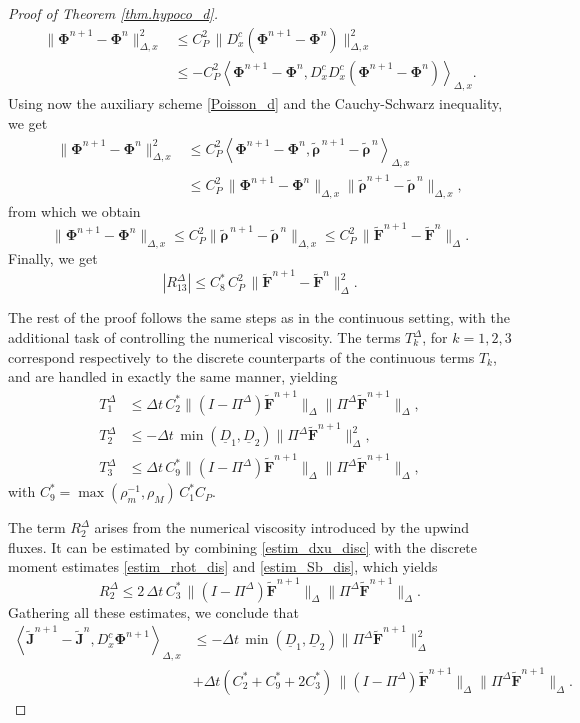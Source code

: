 \documentclass[reqno]{amsart}
\newcommand{\Ft}{{\widetilde{F}}}
\newcommand{\rhot}{\widetilde{\rho}}
\newcommand{\Jt}{\widetilde{J}}
\newcommand{\Ftbf}{\mathbf{\Ft}}
\newcommand{\Phibf}{\boldsymbol{\Phi}}
\newcommand{\rhotbf}{\boldsymbol{\rhot}}
\newcommand{\Jtbf}{\mathbf{\Jt}}
\newcommand{\lla}{\left\langle}
\newcommand{\rra}{\right\rangle}
\numberwithin{equation}{section}
\begin{document}
\begin{proof}[Proof of Theorem \ref{thm.hypoco_d}]
    \begin{align*}
        \|\Phibf^{n+1}-\Phibf^n\|_{\Delta,x}^2&\leq C_P^2\,\|D_x^c(\Phibf^{n+1}-\Phibf^n)\|_{\Delta,x}^2\\
        &\leq -C_P^2\lla \Phibf^{n+1}-\Phibf^n,D_x^cD_x^c(\Phibf^{n+1}-\Phibf^n)\rra_{\Delta,x}.
    \end{align*}
    Using now the auxiliary scheme \eqref{Poisson_d} and the Cauchy-Schwarz inequality, we get
    \begin{align*}
        \|\Phibf^{n+1}-\Phibf^n\|_{\Delta,x}^2&\leq C_P^2\lla \Phibf^{n+1}-\Phibf^n,\rhotbf^{\,n+1}-\rhotbf^{\,n}\rra_{\Delta,x}\\
        &\leq C_P^2 \,\|\Phibf^{n+1}-\Phibf^n\|_{\Delta,x}\|\rhotbf^{n+1}-\rhotbf^{\,n}\|_{\Delta,x},
    \end{align*}
    from which we obtain
    \[
    \|\Phibf^{n+1}-\Phibf^n\|_{\Delta,x}\leq C_P^2 \|\rhotbf^{\,n+1}-\rhotbf^{\,n}\|_{\Delta,x}\leq C_P^2 \,\|\Ftbf^{n+1}-\Ftbf^n\|_{\Delta}.
    \]
    Finally, we get
    \begin{equation}\label{estim_T133}
        |R_{13}^\Delta|\leq C_{8}^*\,C_P^2\,\|\Ftbf^{n+1}-\Ftbf^n\|_{\Delta}^2.
    \end{equation}
    
   The rest of the proof follows the same steps as in the continuous setting, with the additional task of controlling the numerical viscosity. The terms $T_k^\Delta$, for $k=1,2,3$ correspond respectively to the discrete counterparts of the continuous terms $T_k$, and are handled in exactly the same manner, yielding
    \begin{align*}
        T_{1}^\Delta&\leq \Delta t \,C_2^* \|(I-\Pi^\Delta)\Ftbf^{n+1}\|_{\Delta}\|\Pi^\Delta\Ftbf^{n+1}\|_\Delta,\\
        T_{2}^\Delta&\leq -\Delta t\,\min(\underline{D}_1,\underline{D}_2)\|\Pi^\Delta\Ftbf^{n+1}\|_\Delta^2,\\
        T_{3}^\Delta&\leq \Delta t \, C_9^*\|(I-\Pi^\Delta)\Ftbf^{n+1}\|_{\Delta}\|\Pi^\Delta\Ftbf^{n+1}\|_\Delta,
    \end{align*}    
    with $ C_9^*=\max(\rho_m^{-1},\rho_M)\,C_1^*C_P$.
    
    The term $R_{2}^\Delta$ arises from the numerical viscosity introduced by the upwind fluxes. It can be estimated by combining \eqref{estim_dxu_disc} with the discrete moment estimates \eqref{estim_rhot_dis} and \eqref{estim_Sb_dis}, which yields
    \[R_{2}^\Delta \leq 2\,\Delta t\, C^*_{3}\,\|(I-\Pi^\Delta)\Ftbf^{n+1}\|_{\Delta}\|\Pi^\Delta\Ftbf^{n+1}\|_\Delta.\]
    Gathering all these estimates, we conclude that
    \begin{align*}
        \lla \Jtbf^{n+1}-\Jtbf^n,D_x^c\Phibf^{n+1}\rra_{\Delta,x}&\leq -\Delta t\,\min(\underline{D}_1,\underline{D}_2)\|\Pi^\Delta\Ftbf^{n+1}\|_\Delta^2\\
        &+\Delta t\left(C_2^*+C_9^*+2C_3^*\right)\,\|(I-\Pi^\Delta)\Ftbf^{n+1}\|_{\Delta}\|\Pi^\Delta\Ftbf^{n+1}\|_\Delta.
    \end{align*}
    

\end{proof}
\end{document}
